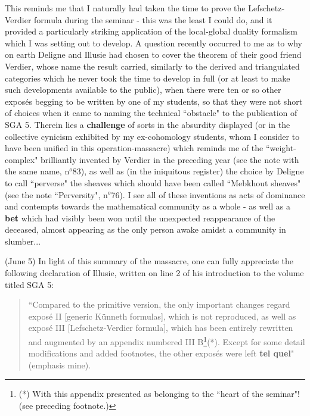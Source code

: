 This reminds me that I naturally had taken the time to prove the Lefschetz-Verdier formula during the seminar - this was the least I could do, and it provided a particularly striking application of the local-global duality formalism which I was setting out to develop. A question recently occurred to me as to why on earth Deligne and Illusie had chosen to cover the theorem of their good friend Verdier, whose name the result carried, similarly to the derived and triangulated categories which he never took the time to develop in full (or at least to make such developments available to the public), when there were ten or so other expos\'es begging to be written by one of my students, so that they were not short of choices when it came to naming the technical ``obstacle" to the publication of SGA 5. Therein lies a \textbf{challenge} of sorts in the absurdity displayed (or in the collective cynicism exhibited by my ex-cohomology students, whom I consider to have been unified in this operation-massacre) which reminds me of the ``weight-complex" brilliantly invented by Verdier in the preceding year (see the note with the same name, n$^o$83), as well as (in the iniquitous register) the choice by Deligne to call ``perverse" the sheaves which should have been called ``Mebkhout sheaves" (see the note ``Perversity", n$^o$76). I see all of these inventions as acts of dominance and contempts towards the mathematical community as a whole - as well as a \textbf{bet} which had visibly been won until the unexpected reappearance of the deceased, almost appearing as the only person awake amidst a community in slumber...

 (June 5) In light of this summary of the massacre, one can fully appreciate the following declaration of Illusie, written on line 2 of his introduction to the volume titled SGA 5:

\begin{quote}
``Compared to the primitive version, the only important changes regard expos\'e II [generic K\"unneth formulas], which is not reproduced, as well as expos\'e III [Lefschetz-Verdier formula], which has been entirely rewritten and augmented by an appendix numbered III B\footnote{(*) With this appendix presented as belonging to the ``heart of the seminar"! (see preceding footnote.)}(*). Except for some detail modifications and added footnotes, the other expos\'es were left \textbf{tel quel}" (emphasis mine).
\end{quote}

